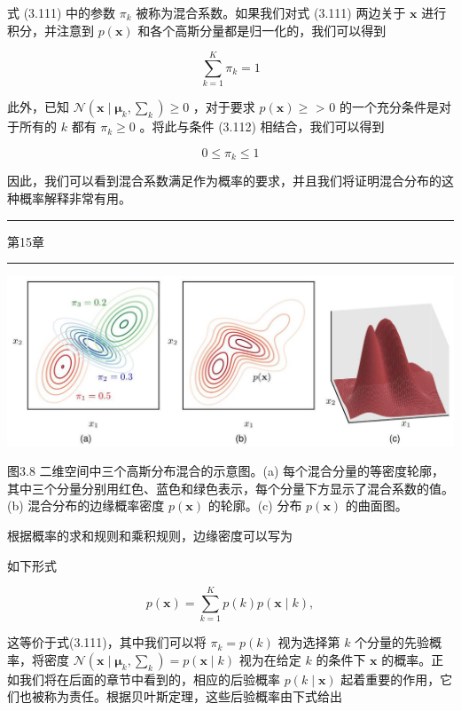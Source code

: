 \documentclass[10pt]{report}
\newcommand{\HRule}{\begin{center}\rule{0.9\linewidth}{0.2mm}\end{center}}
\begin{document}
式 (3.111) 中的参数 \({\pi }_{k}\) 被称为混合系数。如果我们对式 (3.111) 两边关于 \(\mathbf{x}\) 进行积分，并注意到 \(p\left( \mathbf{x}\right)\) 和各个高斯分量都是归一化的，我们可以得到

\[
\mathop{\sum }\limits_{{k = 1}}^{K}{\pi }_{k} = 1 \tag{3.112}
\]

此外，已知 \(\mathcal{N}\left( {\mathbf{x} \mid  {\mathbf{\mu }}_{k},{\mathbf{\sum }}_{k}}\right)  \geq  0\) ，对于要求 \(p\left( \mathbf{x}\right)  \geq\) > 0 的一个充分条件是对于所有的 \(k\) 都有 \({\pi }_{k} \geq  0\) 。将此与条件 (3.112) 相结合，我们可以得到

\[
0 \leq  {\pi }_{k} \leq  1 \tag{3.113}
\]

因此，我们可以看到混合系数满足作为概率的要求，并且我们将证明混合分布的这种概率解释非常有用。

\HRule

第15章

\HRule

\begin{center}
\includegraphics[max width=1.0\textwidth]{images/0194e279-9b28-703a-88f4-c3ac21e2010d_107_199_343_1295_493_0.jpg}
\end{center}
\hspace*{3em} 

图3.8 二维空间中三个高斯分布混合的示意图。(a) 每个混合分量的等密度轮廓，其中三个分量分别用红色、蓝色和绿色表示，每个分量下方显示了混合系数的值。(b) 混合分布的边缘概率密度 \(p\left( \mathbf{x}\right)\) 的轮廓。(c) 分布 \(p\left( \mathbf{x}\right)\) 的曲面图。

根据概率的求和规则和乘积规则，边缘密度可以写为

如下形式

\[
p\left( \mathbf{x}\right)  = \mathop{\sum }\limits_{{k = 1}}^{K}p\left( k\right) p\left( {\mathbf{x} \mid  k}\right) , \tag{3.114}
\]

这等价于式(3.111)，其中我们可以将 \({\pi }_{k} = p\left( k\right)\) 视为选择第 \(k\) 个分量的先验概率，将密度 \(\mathcal{N}\left( {\mathbf{x} \mid  {\mathbf{\mu }}_{k},{\mathbf{\sum }}_{k}}\right)  = p\left( {\mathbf{x} \mid  k}\right)\) 视为在给定 \(k\) 的条件下 \(\mathbf{x}\) 的概率。正如我们将在后面的章节中看到的，相应的后验概率 \(p\left( {k \mid  \mathbf{x}}\right)\) 起着重要的作用，它们也被称为责任。根据贝叶斯定理，这些后验概率由下式给出
\end{document}

